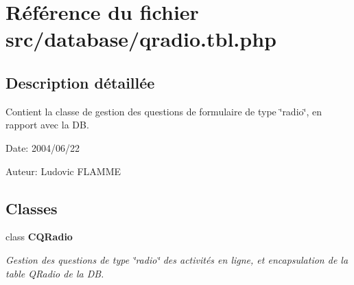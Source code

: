 \section{Référence du fichier src/database/qradio.tbl.php}
\label{qradio_8tbl_8php}


\subsection{Description détaillée}
Contient la classe de gestion des questions de formulaire de type \char`\"{}radio\char`\"{}, en rapport avec la DB. 

\begin{Desc}
\item[Date:]2004/06/22\end{Desc}
\begin{Desc}
\item[Auteur:]Ludovic FLAMME \end{Desc}


\subsection*{Classes}
\begin{CompactItemize}
\item 
class {\bf CQRadio}
\begin{CompactList}\small\item\em Gestion des questions de type \char`\"{}radio\char`\"{} des activités en ligne, et encapsulation de la table QRadio de la DB. \item\end{CompactList}\end{CompactItemize}
